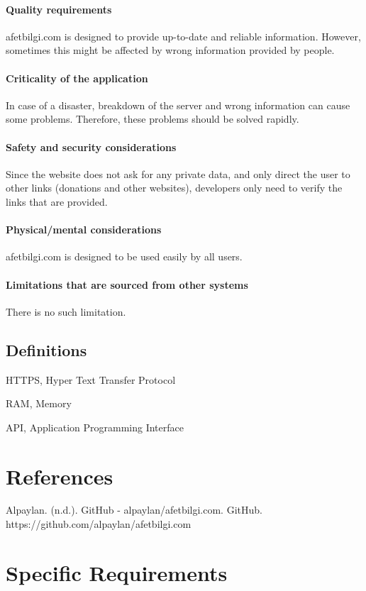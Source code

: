 \documentclass[12pt]{report}
\begin{document}
\subsubsection{Quality requirements} 
afetbilgi.com is designed to provide up-to-date and reliable information. However, sometimes this might be affected by wrong information provided by people.

\subsubsection{Criticality of the application} 
In case of a disaster, breakdown of the server and wrong information can cause some problems. Therefore, these problems should be solved rapidly.

\subsubsection{Safety and security considerations}
Since the website does not ask for any private data, and only direct the user to other links (donations and other websites), developers only need to verify the links that are provided.

\subsubsection{Physical/mental considerations} 
afetbilgi.com is designed to be used easily by all users.

\subsubsection{Limitations that are sourced from other systems}
There is no such limitation.

\section{Definitions}
HTTPS, Hyper Text Transfer Protocol

RAM, Memory

API, Application Programming Interface

\chapter{References}

Alpaylan. (n.d.). GitHub - alpaylan/afetbilgi.com. GitHub. https://github.com/alpaylan/afetbilgi.com

\chapter{Specific Requirements}
\end{document}
